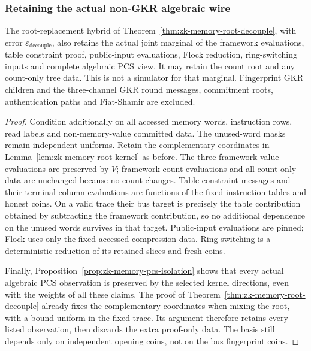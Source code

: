 \subsubsection{Retaining the actual non-GKR algebraic wire}

\begin{corollary}\label{cor:zk-memory-root-wire}
The root-replacement hybrid of Theorem~\ref{thm:zk-memory-root-decouple}, with error $\varepsilon_{\mathrm{decouple}}$, also retains the actual joint marginal of the framework evaluations, table constraint proof, public-input evaluations, Flock reduction, ring-switching inputs and complete algebraic PCS view. It may retain the count root and any count-only tree data. This is not a simulator for that marginal. Fingerprint GKR children and the three-channel GKR round messages, commitment roots, authentication paths and Fiat-Shamir are excluded.
\end{corollary}
\begin{proof}
Condition additionally on all accessed memory words, instruction rows, read labels and non-memory-value committed data. The unused-word masks remain independent uniforms. Retain the complementary coordinates in Lemma~\ref{lem:zk-memory-root-kernel} as before. The three framework value evaluations are preserved by $V$; framework count evaluations and all count-only data are unchanged because no count changes. Table constraint messages and their terminal column evaluations are functions of the fixed instruction tables and honest coins. On a valid trace their bus target is precisely the table contribution obtained by subtracting the framework contribution, so no additional dependence on the unused words survives in that target. Public-input evaluations are pinned; Flock uses only the fixed accessed compression data. Ring switching is a deterministic reduction of its retained slices and fresh coins.

Finally, Proposition~\ref{prop:zk-memory-pcs-isolation} shows that every actual algebraic PCS observation is preserved by the selected kernel directions, even with the weights of all these claims. The proof of Theorem~\ref{thm:zk-memory-root-decouple} already fixes the complementary coordinates when mixing the root, with a bound uniform in the fixed trace. Its argument therefore retains every listed observation, then discards the extra proof-only data. The basis still depends only on independent opening coins, not on the bus fingerprint coins.
\end{proof}

